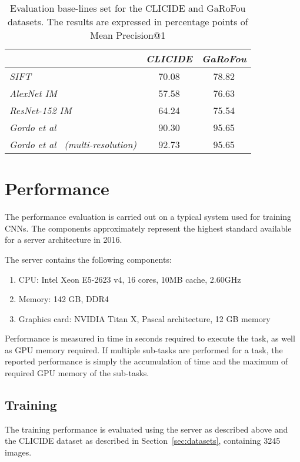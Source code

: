 \begin{table}
\begin{tabular}{|l|c|c|}
\hline & \emph{CLICIDE} & \emph{GaRoFou}\\
\hline \emph{SIFT} & 70.08 & 78.82\\
\hline \emph{AlexNet IM} & 57.58 & 76.63\\
\hline \emph{ResNet-152 IM} & 64.24 & 75.54\\
\hline \emph{Gordo et al~\cite{gordo_deep_2016}} & 90.30 & 95.65\\
\hline \emph{Gordo et al~\cite{gordo_deep_2016} (multi-resolution)}
& 92.73 & 95.65\\
\hline
\end{tabular}
\caption{Evaluation base-lines set for the CLICIDE and GaRoFou datasets.
The results are expressed in percentage points of
Mean Precision@1\label{tab:baselines}}
\end{table}

\section{Performance}
The performance evaluation is carried out on a typical system used for training CNNs.
The components approximately represent the highest standard available for a server
architecture in 2016.

The server contains the following components:
\begin{enumerate}
    \item CPU: Intel\textsuperscript{\textregistered} Xeon\textsuperscript{\textregistered}
    E5-2623 v4, 16 cores, 10MB cache, 2.60GHz
    \item Memory: 142 GB, DDR4 %
    \item Graphics card: NVIDIA\textsuperscript{\textregistered} Titan X, Pascal architecture,
    12 GB memory
\end{enumerate}

Performance is measured in time in seconds required to execute the task,
as well as GPU memory required. If multiple sub-tasks are performed for
a task, the reported performance is simply the accumulation of time and
the maximum of required GPU memory of the sub-tasks.
\subsection{Training}
The training performance is evaluated using the server as described above and the CLICIDE
dataset as described in Section~\ref{sec:datasets}, containing 3245 images.

